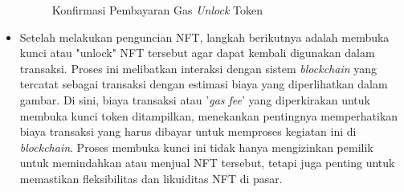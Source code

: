 \begin{itemize}
      \begin{figure} [H] \centering
        \caption{Konfirmasi Pembayaran Gas \emph{Unlock} Token}
        \label{fig:unlock_token}
        \end{figure}
      
    \item Setelah melakukan penguncian NFT, langkah berikutnya adalah membuka kunci atau "unlock" NFT tersebut agar dapat kembali digunakan dalam transaksi. Proses ini melibatkan interaksi dengan sistem \emph{blockchain} yang tercatat sebagai transaksi dengan estimasi biaya yang diperlihatkan dalam gambar. Di sini, biaya transaksi atau '\emph{gas fee}' yang diperkirakan untuk membuka kunci token ditampilkan, menekankan pentingnya memperhatikan biaya transaksi yang harus dibayar untuk memproses kegiatan ini di \emph{blockchain}. Proses membuka kunci ini tidak hanya mengizinkan pemilik untuk memindahkan atau menjual NFT tersebut, tetapi juga penting untuk memastikan fleksibilitas dan likuiditas NFT di pasar.
    

\end{itemize}
